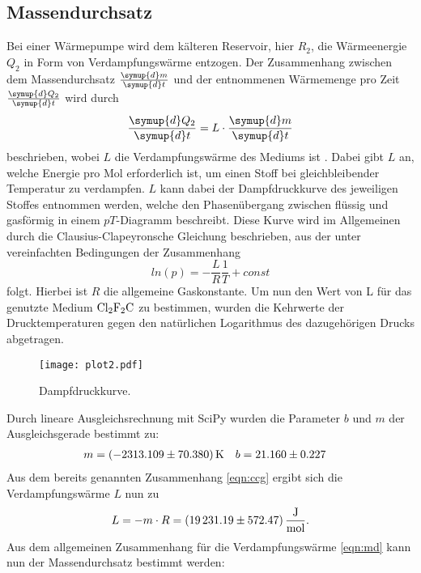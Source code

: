 \subsection{Massendurchsatz}
Bei einer Wärmepumpe wird dem kälteren Reservoir, hier $R_2$, die Wärmeenergie $Q_2$ in Form von Verdampfungswärme entzogen.
Der Zusammenhang zwischen dem Massendurchsatz $\frac{\symup{d} m}{\symup{d} t}$ und der entnommenen Wärmemenge pro Zeit $\frac{\symup{d} Q_2}{\symup{d} t}$ wird durch
\begin{equation}
  \frac{\symup{d} Q_2}{\symup{d}t} = L \cdot \frac{\symup{d} m}{\symup{d} t}
    \label{eqn:md}
\end{equation}
beschrieben, wobei $L$ die Verdampfungswärme des Mediums ist \cite{V203}.
Dabei gibt $L$ an, welche Energie pro Mol erforderlich ist, um einen Stoff bei gleichbleibender Temperatur zu verdampfen.
$L$ kann dabei der Dampfdruckkurve des jeweiligen Stoffes entnommen werden, welche den Phasenübergang zwischen flüssig und gasförmig in einem $pT$-Diagramm beschreibt.
Diese Kurve wird im Allgemeinen durch die Clausius-Clapeyronsche Gleichung beschrieben, aus der unter vereinfachten Bedingungen der Zusammenhang
\begin{equation}
  ln(p)= -\frac{L}{R}\frac{1}{T} + const
  \label{eqn:ccg}
\end{equation}
folgt.
Hierbei ist $R$ die allgemeine Gaskonstante.
Um nun den Wert von L für das genutzte Medium $\ce{Cl2F2C}$ zu bestimmen, wurden die Kehrwerte der Drucktemperaturen gegen den natürlichen Logarithmus des dazugehörigen Drucks abgetragen.
\begin{figure}[H]
  \centering
  \texttt{[image: plot2.pdf]}
  \caption{Dampfdruckkurve.}
  \label{fig:plot2}
\end{figure}
Durch lineare Ausgleichsrechnung mit SciPy wurden die Parameter $b$ und $m$ der Ausgleichsgerade bestimmt zu:
\begin{align*}
m &= \SI{-2313.109 +- 70.380}{\kelvin} & b &= \num{21.160 +- 0.227}
\end{align*}
Aus dem bereits genannten Zusammenhang \eqref{eqn:ccg} ergibt sich die Verdampfungswärme $L$ nun zu
\begin{align*}
  L = -m \cdot R = \SI[per-mode=fraction]{19231.19 +- 572.47}{\joule\per\mol}.
\end{align*}
Aus dem allgemeinen Zusammenhang für die Verdampfungswärme \eqref{eqn:md} kann nun der Massendurchsatz bestimmt werden:

